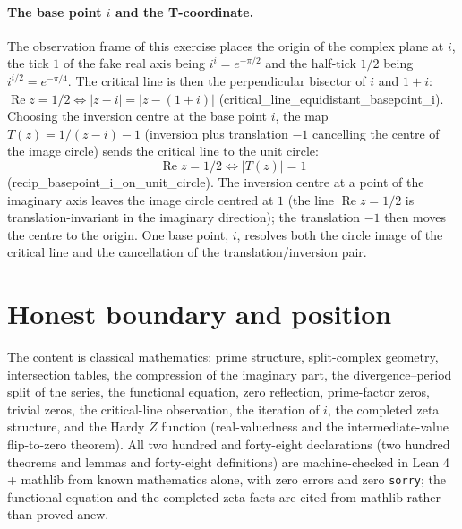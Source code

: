 \documentclass[sigplan,10pt,anonymous,review]{acmart}
\begin{document}
\paragraph{The base point $i$ and the T-coordinate.} The observation
frame of this exercise places the origin of the complex plane at
$i$, the tick $1$ of the fake real axis being $i^i = e^{-\pi/2}$ and
the half-tick $1/2$ being $i^{i/2} = e^{-\pi/4}$. The critical line
is then the perpendicular bisector of $i$ and $1+i$:
$\operatorname{Re}z = 1/2 \iff |z-i| = |z-(1+i)|$
(critical\_line\_equidistant\_basepoint\_i). Choosing the inversion
centre at the base point $i$, the map
$T(z) = 1/(z-i) - 1$ (inversion plus translation $-1$ cancelling the
centre of the image circle) sends the critical line to the unit
circle:
\begin{equation*}
  \operatorname{Re}z = 1/2 \iff |T(z)| = 1
\end{equation*}
(recip\_basepoint\_i\_on\_unit\_circle). The inversion centre at a
point of the imaginary axis leaves the image circle centred at $1$
(the line $\operatorname{Re}z = 1/2$ is translation-invariant in the
imaginary direction); the translation $-1$ then moves the centre to
the origin. One base point, $i$, resolves both the circle image of
the critical line and the cancellation of the translation/inversion
pair.

\section{Honest boundary and position}

The content is classical mathematics: prime structure, split-complex
geometry, intersection tables, the compression of the imaginary part,
the divergence--period split of the series, the functional equation,
zero reflection, prime-factor zeros, trivial zeros, the critical-line
observation, the iteration of $i$, the completed zeta structure, and
the Hardy $Z$ function (real-valuedness and the intermediate-value
flip-to-zero theorem). All two hundred and forty-eight declarations (two
hundred theorems and lemmas and forty-eight definitions) are
machine-checked in Lean 4 + mathlib from known mathematics alone,
with zero errors and zero \texttt{sorry}; the functional equation and
the completed zeta facts are cited from mathlib rather than proved anew.
\end{document}

